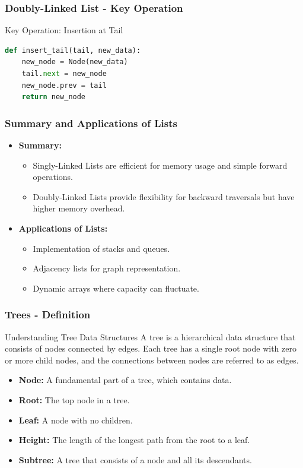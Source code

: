 \documentclass{beamer}
\begin{document}
\begin{frame}[fragile]
    \frametitle{Doubly-Linked List - Key Operation}
    \begin{block}{Key Operation: Insertion at Tail}
        \begin{lstlisting}[language=Python]
def insert_tail(tail, new_data):
    new_node = Node(new_data)
    tail.next = new_node
    new_node.prev = tail
    return new_node
        \end{lstlisting}
    \end{block}
\end{frame}

\begin{frame}[fragile]
    \frametitle{Summary and Applications of Lists}
    \begin{itemize}
        \item \textbf{Summary:}
        \begin{itemize}
            \item Singly-Linked Lists are efficient for memory usage and simple forward operations.
            \item Doubly-Linked Lists provide flexibility for backward traversals but have higher memory overhead.
        \end{itemize}
        
        \item \textbf{Applications of Lists:}
        \begin{itemize}
            \item Implementation of stacks and queues.
            \item Adjacency lists for graph representation.
            \item Dynamic arrays where capacity can fluctuate.
        \end{itemize}
    \end{itemize}
\end{frame}

\begin{frame}[fragile]
    \frametitle{Trees - Definition}
    \begin{block}{Understanding Tree Data Structures}
        A tree is a hierarchical data structure that consists of nodes connected by edges. 
        Each tree has a single root node with zero or more child nodes, and the connections 
        between nodes are referred to as edges.
    \end{block}
    
    \begin{itemize}
        \item \textbf{Node:} A fundamental part of a tree, which contains data.
        \item \textbf{Root:} The top node in a tree.
        \item \textbf{Leaf:} A node with no children.
        \item \textbf{Height:} The length of the longest path from the root to a leaf.
        \item \textbf{Subtree:} A tree that consists of a node and all its descendants.
    \end{itemize}
\end{frame}
\end{document}
